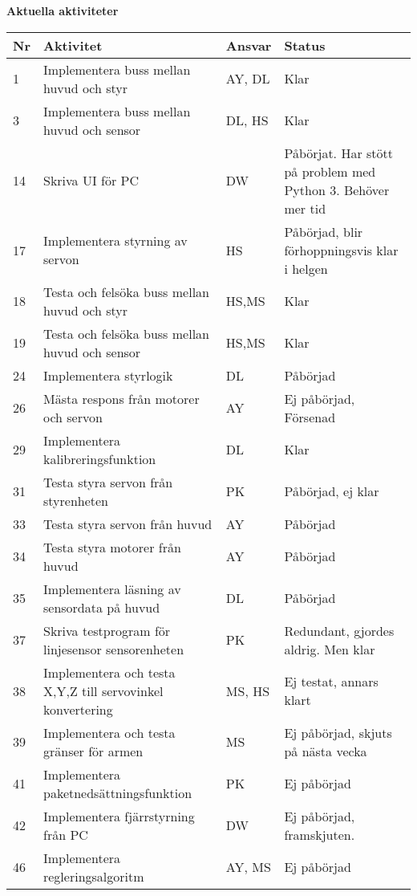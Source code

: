 \documentclass[titlepage, a4paper]{article}
\begin{document}
\newpage
\textbf{\Large Aktuella aktiviteter}
\begin{center}
\begin{tabularx}{\textwidth}{| p{4mm} | X | p{13.5mm} | X |}
	\hline
	\textbf{Nr} & \textbf{Aktivitet} & \textbf{Ansvar} & \textbf{Status} \\\hline	
	{1} & {Implementera buss mellan huvud och styr} & {AY, DL} & {Klar} \\\hline
	{3} & {Implementera buss mellan huvud och sensor} & {DL, HS} & {Klar} \\\hline
	{14} & {Skriva UI för PC} & {DW} & {Påbörjat. Har stött på problem med Python 3. Behöver mer tid} \\\hline
	{17} & {Implementera styrning av servon} & {HS} & {Påbörjad, blir förhoppningsvis klar i helgen} \\\hline
	{18} & {Testa och felsöka buss mellan huvud och styr} & {HS,MS} & {Klar} \\\hline
	{19} & {Testa och felsöka buss mellan huvud och sensor} & {HS,MS} & {Klar} \\\hline
	{24} & {Implementera styrlogik} & {DL} & {Påbörjad} \\\hline
	{26} & {Mästa respons från motorer och servon} & {AY} & {Ej påbörjad, Försenad} \\\hline
	{29} & {Implementera kalibreringsfunktion} & {DL} & {Klar} \\\hline
	{31} & {Testa styra servon från styrenheten} & {PK} & {Påbörjad, ej klar} \\\hline
	{33} & {Testa styra servon från huvud} & {AY} & {Påbörjad} \\\hline
	{34} & {Testa styra motorer från huvud} & {AY} & {Påbörjad} \\\hline
	{35} & {Implementera läsning av sensordata på huvud} & {DL} & {Påbörjad} \\\hline
	{37} & {Skriva testprogram för linjesensor sensorenheten} & {PK} & {Redundant, gjordes aldrig. Men klar} \\\hline
	{38} & {Implementera och testa X,Y,Z  till servovinkel konvertering} & {MS, HS} & {Ej testat, annars klart} \\\hline
	{39} & {Implementera och testa gränser för armen} & {MS} & {Ej påbörjad, skjuts på nästa vecka} \\\hline
	{41} & {Implementera paketnedsättningsfunktion} & {PK} & {Ej påbörjad} \\\hline
	{42} & {Implementera fjärrstyrning från PC} & {DW} & {Ej påbörjad, framskjuten.} \\\hline
	{46} & {Implementera regleringsalgoritm} & {AY, MS} & {Ej påbörjad} \\\hline
\end{tabularx}
\end{center}
\end{document}
